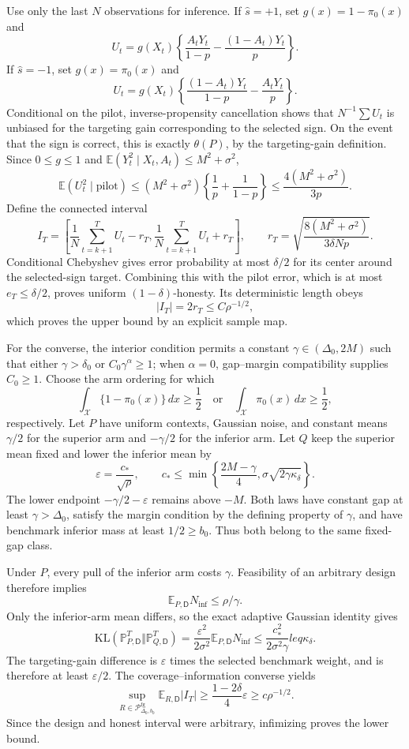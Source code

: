 Use only the last \(N\) observations for inference.  If \(\widehat s=+1\), set \(g(x)=1-\pi_0(x)\) and
\[
U_t=g(X_t)\left\{\frac{A_tY_t}{1-p}-\frac{(1-A_t)Y_t}{p}\right\}.
\]
If \(\widehat s=-1\), set \(g(x)=\pi_0(x)\) and
\[
U_t=g(X_t)\left\{\frac{(1-A_t)Y_t}{1-p}-\frac{A_tY_t}{p}\right\}.
\]
Conditional on the pilot, inverse-propensity cancellation shows that \(N^{-1}\sum U_t\) is unbiased for the targeting gain corresponding to the selected sign.  On the event that the sign is correct, this is exactly \(\theta(P)\), by the targeting-gain definition.  Since \(0\leq g\leq1\) and \(\mathbb E(Y_t^2\mid X_t,A_t)\leq M^2+\sigma^2\),
\[
\mathbb E(U_t^2\mid\text{pilot})
\leq(M^2+\sigma^2)\left\{\frac1p+\frac1{1-p}\right\}
\leq\frac{4(M^2+\sigma^2)}{3p}.
\]
Define the connected interval
\[
I_T=\left[
\frac1N\sum_{t=k+1}^T U_t-r_T,
\frac1N\sum_{t=k+1}^T U_t+r_T
\right],
\qquad
r_T=\sqrt{\frac{8(M^2+\sigma^2)}{3\delta Np}}.
\]
Conditional Chebyshev gives error probability at most \(\delta/2\) for its center around the selected-sign target.  Combining this with the pilot error, which is at most \(e_T\leq\delta/2\), proves uniform \((1-\delta)\)-honesty.  Its deterministic length obeys
\[
|I_T|=2r_T\leq C\rho^{-1/2},
\]
which proves the upper bound by an explicit sample map.

For the converse, the interior condition permits a constant \(\gamma\in(\Delta_0,2M)\) such that either \(\gamma>\delta_0\) or \(C_0\gamma^\alpha\geq1\); when \(\alpha=0\), gap--margin compatibility supplies \(C_0\geq1\).  Choose the arm ordering for which
\[
\int_{\mathcal X}\{1-\pi_0(x)\}\,dx\geq\frac12
\quad\text{or}\quad
\int_{\mathcal X}\pi_0(x)\,dx\geq\frac12,
\]
respectively.  Let \(P\) have uniform contexts, Gaussian noise, and constant means \(\gamma/2\) for the superior arm and \(-\gamma/2\) for the inferior arm.  Let \(Q\) keep the superior mean fixed and lower the inferior mean by
\[
\varepsilon=\frac{c_*}{\sqrt\rho},
\qquad
c_*\leq\min\left\{\frac{2M-\gamma}{4},\sigma\sqrt{2\gamma\kappa_\delta}\right\}.
\]
The lower endpoint \(-\gamma/2-\varepsilon\) remains above \(-M\).  Both laws have constant gap at least \(\gamma>\Delta_0\), satisfy the margin condition by the defining property of \(\gamma\), and have benchmark inferior mass at least \(1/2\geq b_0\).  Thus both belong to the same fixed-gap class.

Under \(P\), every pull of the inferior arm costs \(\gamma\).  Feasibility of an arbitrary design therefore implies
\[
\mathbb E_{P,\mathsf D}N_{\mathrm{inf}}\leq\rho/\gamma.
\]
Only the inferior-arm mean differs, so the exact adaptive Gaussian identity gives
\[
\mathrm{KL}(\mathbb P_{P,\mathsf D}^{T}\Vert\mathbb P_{Q,\mathsf D}^{T})
=\frac{\varepsilon^2}{2\sigma^2}
\mathbb E_{P,\mathsf D}N_{\mathrm{inf}}
\leq\frac{c_*^2}{2\sigma^2\gamma}leq\kappa_\delta.
\]
The targeting-gain difference is \(\varepsilon\) times the selected benchmark weight, and is therefore at least \(\varepsilon/2\).  The coverage--information converse yields
\[
\sup_{R\in\mathcal P_{\Delta_0,b_0}^{\mathrm{fg}}}
\mathbb E_{R,\mathsf D}|I_T|
\geq\frac{1-2\delta}{4}\varepsilon
\geq c\rho^{-1/2}.
\]
Since the design and honest interval were arbitrary, infimizing proves the lower bound.

